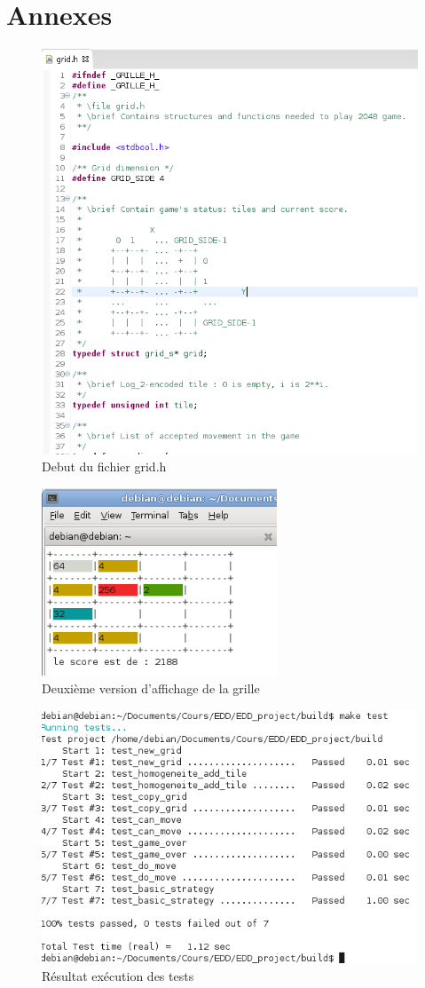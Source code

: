 \documentclass[12pt]{article}
\begin{document}
\section{Annexes}
\listoffigures
\begin{figure}
   \caption{\label{grid_h} Debut du fichier grid.h}
   \includegraphics[scale=0.6]{grid_h.png}
\end{figure}

\begin{figure}
   \caption{\label{grille_couleur} Deuxi\`eme version d'affichage de la grille}
   \includegraphics[width=7cm]{grille_couleur.png}
\end{figure}

\begin{figure}
   \caption{\label{test} R\'esultat ex\'ecution des tests}
   \includegraphics[scale=0.6]{test.png}
\end{figure}
\end{document}
